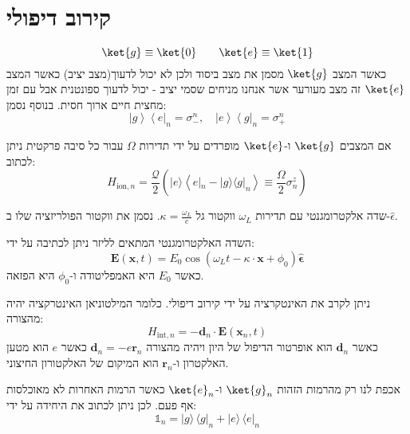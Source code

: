 \documentclass{tstextbook}
\begin{document}
\section{קירוב דיפולי}

\begin{symbolize}
$$\ket{g} \equiv \ket{0} \qquad \ket{e} \equiv \ket{1} $$
כאשר המצב \(\ket{g}\) מסמן את מצב ביסוד ולכן לא יכול לדעוך(מצב יציב) כאשר המצב \(\ket{e}\) זה מצב מעורער אשר אנחנו מניחים שסמי יציב - יכול לדעוך ספונטנית אבל עם זמן מחצית חיים ארוך חסית. בנוסף נסמן:
$$\left|g\right\rangle\left\langle e\right|_{n}=\sigma_{-}^{n},\quad\left|e\right\rangle\left\langle g\right|_{n}=\sigma_{+}^{n}$$

\end{symbolize}
\begin{proposition}
אם המצבים \(\ket{g}\) ו-\(\ket{e}\) מופרדים על ידי תדירות \(\Omega\) עבור כל סיבה פרקטית ניתן לכתוב:
$$H_{\mathrm{ion,}n}=\frac{\mathcal{Q}}{2}\left(|e\rangle\left\langle e|_{n}-|g\rangle\langle g|_{n}\right\rangle\equiv\frac{\Omega}{2}\sigma_{n}^{z}\right)$$

\end{proposition}
\begin{definition}[לייזר]
שדה אלקטרומגנטי עם תדירות \(\omega_{L}\) ווקטור גל \(\kappa=\frac{\omega_{L}}{c}\). נסמן את ווקטור הפולריזציה שלו ב-\(\hat{\epsilon}\).

\end{definition}
\begin{corollary}
השדה האלקטרומגנטי המתאים לליזר ניתן לכתיבה על ידי:
$$\mathbf{E}\left(\mathbf{x},t\right)=E_{0}\cos\left(\omega_{L}t-\kappa\cdot\mathbf{x}+\phi_{0}\right){\hat{\mathbf{\epsilon}}}$$
כאשר \(E_{0}\) היא האמפליטודה ו-\(\phi_{0}\) היא הפזאה. 

\end{corollary}
\begin{proposition}
ניתן לקרב את האינטקרציה על ידי קירוב דיפולי. כלומר המילטוניאן האינטרקציה יהיה מהצורה:
$$H_{\mathrm{int},n}=-\mathbf{d}_{n}\cdot\mathbf{E}\left(\mathbf{x}_{n},t\right)$$
כאשר \(\mathbf{d}_{n}\) הוא אופרטור הדיפול של היון ויהיה מהצורה \(\mathbf{d}_{n}=-e\mathbf{r}_{n}\) כאשר \(e\) הוא מטען האלקטרון ו-\(\mathbf{r}_{n}\) הוא המיקום של האלקטורון החיצוני.

\end{proposition}
\begin{proposition}
אכפת לנו רק מהרמות הזהות \(\ket{g}_{n}\) ו-\(\ket{e}_{n}\) כאשר הרמות האחרות לא מאוכלסות אף פעם. לכן ניתן לכתוב את היחידה על ידי:
$$\mathbb{1}_{n}=|g\rangle\,\langle g|_{n}+|e\rangle\,\langle e|_{n}$$

\end{proposition}
\end{document}
